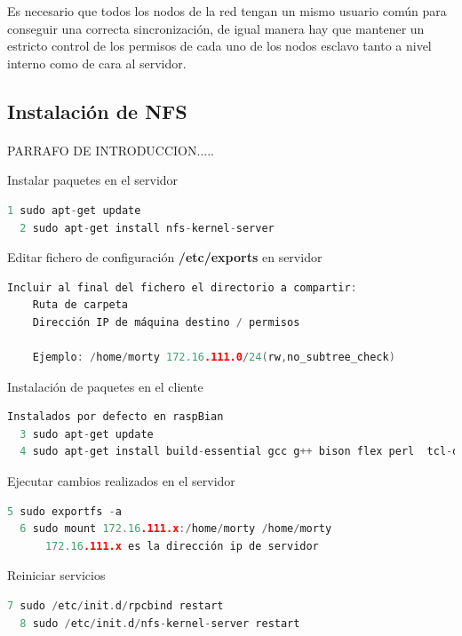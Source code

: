 Es necesario que todos los nodos de la red tengan un mismo usuario común para conseguir una correcta sincronización, de igual manera hay que mantener un estricto control de los permisos de cada uno de los nodos esclavo tanto a nivel interno como de cara al servidor.

\subsection{Instalación de NFS}
\paragraph{}

PARRAFO DE INTRODUCCION.....

Instalar paquetes en el servidor

\begin{lstlisting}[language=c,frame=single,numbers=none]
  1	sudo apt-get update
  2	sudo apt-get install nfs-kernel-server
\end{lstlisting}

Editar fichero de configuración \textbf{/etc/exports} en servidor
\begin{lstlisting}[language=c,frame=single,numbers=none]
	Incluir al final del fichero el directorio a compartir:
	Ruta de carpeta
	Dirección IP de máquina destino / permisos

	Ejemplo: /home/morty 172.16.111.0/24(rw,no_subtree_check)
\end{lstlisting}

Instalación de paquetes en el cliente
\begin{lstlisting}[language=c,frame=single,numbers=none]
  Instalados por defecto en raspBian
  3	sudo apt-get update
  4	sudo apt-get install build-essential gcc g++ bison flex perl  tcl-dev tk-dev libxml2-dev zlib1g-dev default-jre doxygen graphviz libwebkitgtk-1.0-0 openmpi-bin libopenmpi-dev libpcap-dev
\end{lstlisting}

Ejecutar cambios realizados en el servidor

\begin{lstlisting}[language=c,frame=single,numbers=none]
  5	sudo exportfs -a
  6	sudo mount 172.16.111.x:/home/morty /home/morty
      172.16.111.x es la dirección ip de servidor
\end{lstlisting}

Reiniciar servicios 
\begin{lstlisting}[language=c,frame=single,numbers=none]
  7	sudo /etc/init.d/rpcbind restart
  8	sudo /etc/init.d/nfs-kernel-server restart
\end{lstlisting}

